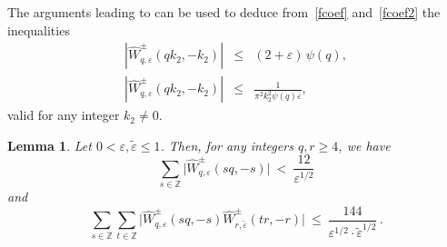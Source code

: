 \documentclass[12pt, reqno]{amsart}
\newtheorem{lemma}[thm]{Lemma}
\theoremstyle{definition}
\theoremstyle{remark}
\numberwithin{equation}{section}
\def\le{\leqslant} \def\ge{\geqslant}
\def\leq{\leqslant}
\def\geq{\geqslant}
\def \bZ {\mathbb Z}
\begin{document}
The arguments leading to \cite[Equations (51) and (52)]{PVZZ2022} can be used to deduce from~\eqref{fcoef} and~\eqref{fcoef2} the inequalities
\begin{eqnarray} \label{ub_Wpm_zero}
|\widehat{W}_{q,\varepsilon}^{\pm}(qk_2,-k_2)| &\leq& (2+\varepsilon) \, \psi(q),\label{W_ub_psi}\\
\label{ub_Wpm_nonzero}
|\widehat{W}_{q,\varepsilon}^{\pm}(q k_2,-k_2)| &\leq& \frac{1}{\pi^2k_2^2\psi(q)\varepsilon} \label{W_ub_1s2},
\end{eqnarray}
valid for any integer $k_2\neq 0$. 
 
 
\begin{lemma} \label{main_part_bounded}
Let $0< \varepsilon,\tilde{\varepsilon} \le 1$.  Then, for any integers $q, r \geq 4$, we have
\begin{equation} \label{ub_single_sum}
\sum_{s \in \bZ} \big|\widehat{W}_{q,\varepsilon}^{\pm}(sq,-s)\big| \  <  \ \frac{12}{\varepsilon^{1/2}}
\end{equation}
and
\begin{equation} \label{ub_double_sum}
\sum_{s\in \bZ}   \sum_{t\in \bZ}  \big|\widehat{W}_{q,\varepsilon}^{\pm}(sq,-s)
\widehat{W}_{r,\tilde{\varepsilon}}^{\pm}(tr,-r)\big|  \ \leq \  \frac{144}{\varepsilon^{1/2}\cdot\tilde{\varepsilon}^{1/2}}  \, .
\end{equation}
\end{lemma}
\end{document}
